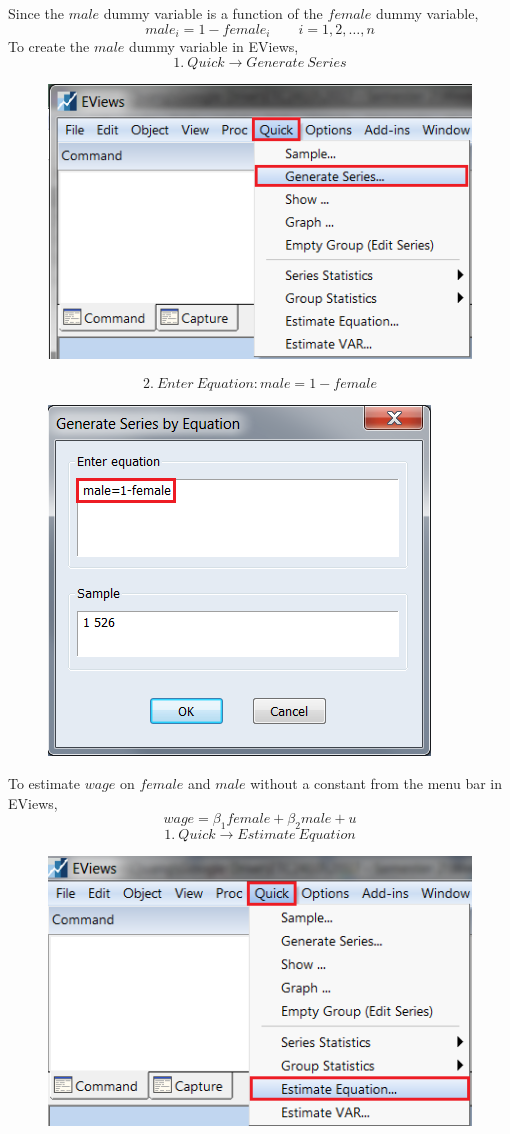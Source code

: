 \documentclass[12pt]{report}
\begin{document}
\noindent Since the $male$ dummy variable is a function of the $female$ dummy variable,
$$
male_i = 1-female_i \qquad i = 1,2,\dots,n
$$
\noindent To create the $male$ dummy variable in EViews,
$$1.\ Quick \to Generate\ Series$$
\begin{figure}[H]
	\centering
	\includegraphics{q2_3}
\end{figure}
\vspace{-\baselineskip}
$$2.\ Enter\ Equation: male=1-female$$
\begin{figure}[H]
	\centering
	\includegraphics{q2_4}
\end{figure}
\vspace{-\baselineskip}
\noindent To estimate $wage$ on $female$ and $male$ without a constant from the menu bar in EViews, 
$$wage = \beta_1female +\beta_2male + u$$
$$1.\ Quick \to Estimate\ Equation$$
\begin{figure}[H]
	\centering
	\includegraphics{q1_2}
\end{figure}
\end{document}
